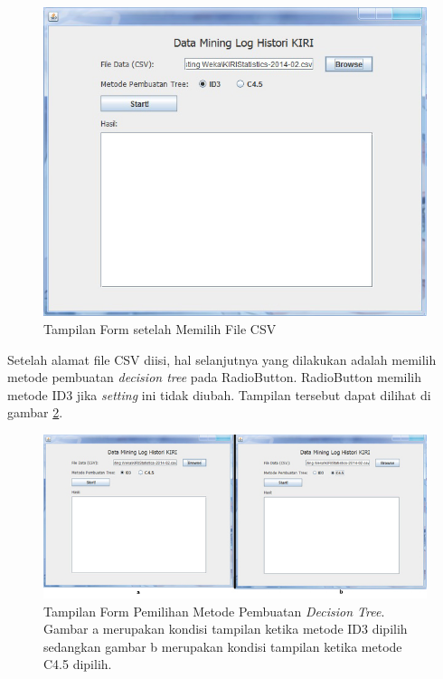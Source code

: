 \begin{figure}[H]
\centering
\includegraphics[scale=0.7]{Gambar/GUI3.jpg}
\caption[Tampilan Form setelah Memilih File CSV]{Tampilan Form setelah Memilih File CSV} 
\label{fig:GUI3}
\end{figure}

Setelah alamat file CSV diisi, hal selanjutnya yang dilakukan adalah memilih metode pembuatan \textsl{decision tree} pada RadioButton. RadioButton memilih metode ID3 jika \textsl{setting} ini tidak diubah. Tampilan tersebut dapat dilihat di gambar \ref{fig:GUI3and4}.

\begin{figure}[H]
\centering
\includegraphics[scale=0.7]{Gambar/GUI3and4.jpg}
\caption[Tampilan Form Pemilihan Metode Pembuatan \textsl{Decision Tree}]{Tampilan Form Pemilihan Metode Pembuatan \textsl{Decision Tree}. Gambar a merupakan kondisi tampilan ketika metode ID3 dipilih sedangkan gambar b merupakan kondisi tampilan ketika metode C4.5 dipilih.} 
\label{fig:GUI3and4}
\end{figure}

